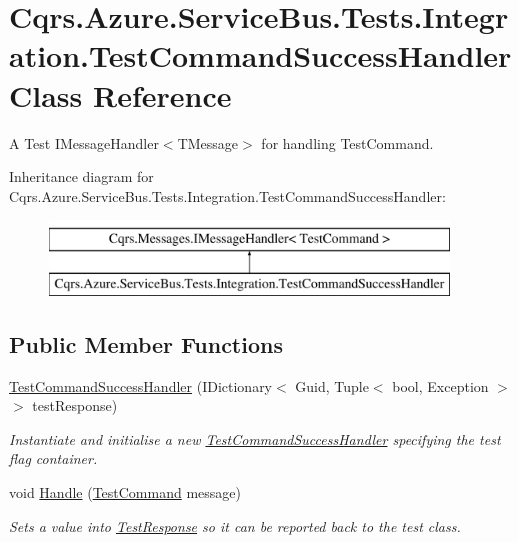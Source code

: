 \hypertarget{classCqrs_1_1Azure_1_1ServiceBus_1_1Tests_1_1Integration_1_1TestCommandSuccessHandler}{}\section{Cqrs.\+Azure.\+Service\+Bus.\+Tests.\+Integration.\+Test\+Command\+Success\+Handler Class Reference}
\label{classCqrs_1_1Azure_1_1ServiceBus_1_1Tests_1_1Integration_1_1TestCommandSuccessHandler}


A Test I\+Message\+Handler$<$\+T\+Message$>$ for handling Test\+Command.  


Inheritance diagram for Cqrs.\+Azure.\+Service\+Bus.\+Tests.\+Integration.\+Test\+Command\+Success\+Handler\+:\begin{figure}[H]
\begin{center}
\leavevmode
\includegraphics[height=2.000000cm]{classCqrs_1_1Azure_1_1ServiceBus_1_1Tests_1_1Integration_1_1TestCommandSuccessHandler}
\end{center}
\end{figure}
\subsection*{Public Member Functions}
\begin{DoxyCompactItemize}
\item 
\hyperlink{classCqrs_1_1Azure_1_1ServiceBus_1_1Tests_1_1Integration_1_1TestCommandSuccessHandler_a1ffd3c5c1e179f38bbccbbdec48e9701_a1ffd3c5c1e179f38bbccbbdec48e9701}{Test\+Command\+Success\+Handler} (I\+Dictionary$<$ Guid, Tuple$<$ bool, Exception $>$$>$ test\+Response)
\begin{DoxyCompactList}\small\item\em Instantiate and initialise a new \hyperlink{classCqrs_1_1Azure_1_1ServiceBus_1_1Tests_1_1Integration_1_1TestCommandSuccessHandler}{Test\+Command\+Success\+Handler} specifying the test flag container. \end{DoxyCompactList}\item 
void \hyperlink{classCqrs_1_1Azure_1_1ServiceBus_1_1Tests_1_1Integration_1_1TestCommandSuccessHandler_a235fa7b6ffe7108a47e33d5eb1c4fa49_a235fa7b6ffe7108a47e33d5eb1c4fa49}{Handle} (\hyperlink{classCqrs_1_1Azure_1_1ServiceBus_1_1Tests_1_1Unit_1_1TestCommand}{Test\+Command} message)
\begin{DoxyCompactList}\small\item\em Sets a value into \hyperlink{classCqrs_1_1Azure_1_1ServiceBus_1_1Tests_1_1Integration_1_1TestCommandSuccessHandler_a2e843e55bab5553cd1ecfaa330d76ef2_a2e843e55bab5553cd1ecfaa330d76ef2}{Test\+Response} so it can be reported back to the test class. \end{DoxyCompactList}\end{DoxyCompactItemize}

